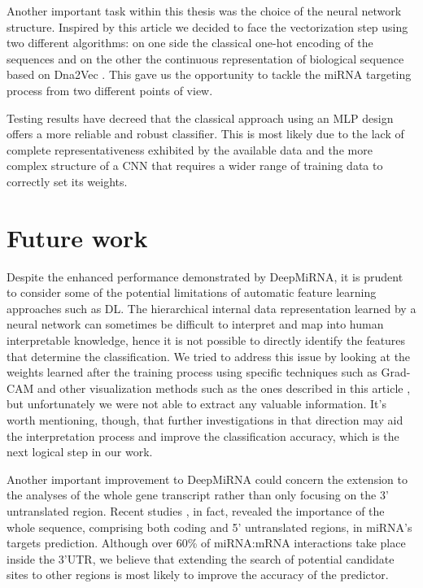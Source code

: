 Another important task within this thesis was the choice of the neural network structure. Inspired by this article \cite{continuous_representation} we decided to face the vectorization step using two different algorithms: on one side the classical one-hot encoding of the sequences and on the other the continuous representation of biological sequence based on Dna2Vec \cite{dna_distributed_repr}. This gave us the opportunity to tackle the miRNA targeting process from two different points of view.

Testing results have decreed that the classical approach using an MLP design offers a more reliable and robust classifier. This is most likely due to the lack of complete representativeness exhibited by the available data and the more complex structure of a CNN that requires a wider range of training data to correctly set its weights. 

\section{Future work}
Despite the enhanced performance demonstrated by DeepMiRNA, it is prudent to consider
some of the potential limitations of automatic feature learning approaches such as DL. The hierarchical internal data representation learned by a neural network can sometimes be difficult to interpret and map into human interpretable knowledge, hence it is not possible to directly identify the features that determine the classification. We tried to address this issue by looking at the weights learned after the training process using specific techniques such as Grad-CAM \cite{gradcam} and other visualization methods such as the ones described in this article \cite{nlp_visualizing}, but unfortunately we were not able to extract any valuable information. It's worth mentioning, though, that further investigations in that direction may aid the interpretation process and improve the classification accuracy, which is the next logical step in our work.

Another important improvement to DeepMiRNA could concern the extension to the analyses of the whole gene transcript rather than only focusing on the 3' untranslated region. Recent studies \cite{mirwalk} \cite{helwak}, in fact, revealed the importance of the whole sequence, comprising both coding and 5' untranslated regions, in miRNA's targets prediction. Although over 60\% of miRNA:mRNA interactions take place inside the 3'UTR, we believe that extending the search of potential candidate sites to other regions is most likely to improve the accuracy of the predictor. 

